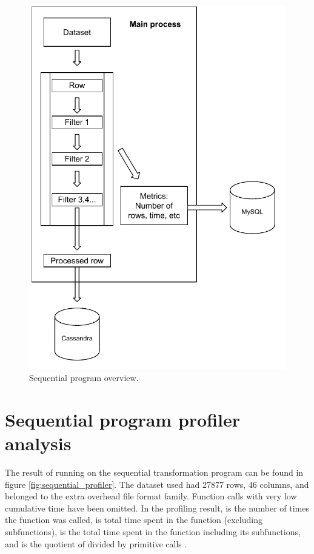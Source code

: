 \begin{figure}[ht]
  \centering
  \includegraphics[width=120mm]{figures/program_overview_sequential.pdf}
  \caption[Sequential program overview.]{Sequential program overview.}
  \label{fig:sequential_program_overview}
\end{figure}

\section{Sequential program profiler analysis} \label{section:sequential_profiler}
The result of running  on the sequential transformation program can be found in figure \ref{fig:sequential_profiler}. The dataset used had
27877 rows, 46 columns, and belonged to the extra overhead file format family.
Function calls with very low cumulative time have been omitted. In the profiling result,  is the number of times the function was called,
 is total time spent in the function (excluding subfunctions),  is the total time spent in the function
including its subfunctions, and  is the quotient of  divided by primitive calls \cite{26_2tppp2d}.

